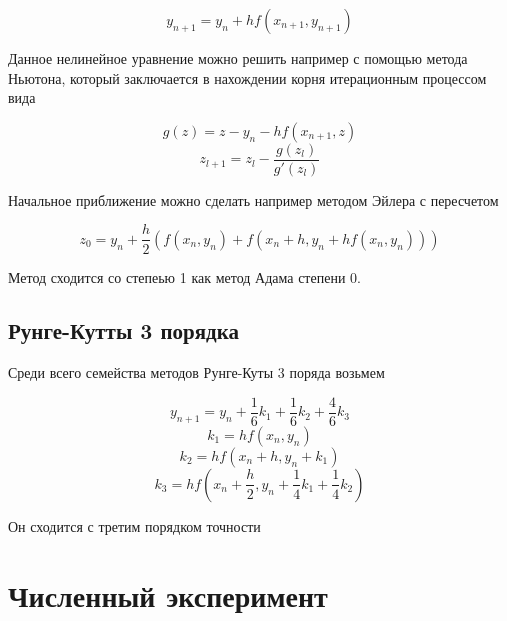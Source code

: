 \documentclass[11pt,a4paper,oneside]{article}
\begin{document}
$$ y_{n + 1} = y_n + h f(x_{n + 1}, y_{n + 1}) $$

Данное нелинейное уравнение можно решить например с помощью метода Ньютона, который заключается в нахождении корня итерационным процессом вида

$$ g(z) = z - y_n - h f(x_{n + 1}, z) $$
$$ z_{l + 1} = z_{l} - \frac{g(z_l)}{g'(z_l)} $$

Начальное приближение можно сделать например методом Эйлера с пересчетом

$$ z_0 = y_n + \frac{h}{2} \left( f(x_n, y_n) + f(x_n + h, y_n + h f(x_n, y_n)) \right)$$

Метод сходится со степеью 1 как метод Адама степени 0.

\pagebreak
\subsection{Рунге-Кутты 3 порядка}

Среди всего семейства методов Рунге-Куты 3 поряда возьмем

$$ y_{n + 1} = y_n + \frac{1}{6} k_1
	+ \frac{1}{6} k_2
	+ \frac{4}{6} k_3 $$
$$ k_1 = h f(x_n, y_n) $$
$$ k_2 = h f(x_n + h, y_n + k_1) $$
$$ k_3 = h f(x_n + \frac{h}{2}, y_n + \frac{1}{4} k_1 + \frac{1}{4} k_2) $$

Он сходится с третим порядком точности

\section{Численный эксперимент}
\end{document}
